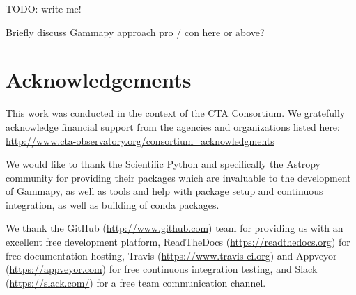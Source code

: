 \documentclass{PoS}
\newcommand{\url}[1]{\href{#1}{#1}}
\begin{document}
TODO: write me!

Briefly discuss Gammapy approach pro / con here or above?

\section{Acknowledgements}
\label{sed:acknowledgements}

This work was conducted in the context of the CTA Consortium. We gratefully
acknowledge financial support from the agencies and organizations listed here:
\url{http://www.cta-observatory.org/consortium\_acknowledgments}

We would like to thank the Scientific Python and specifically the Astropy
community for providing their packages which are invaluable to the development
of Gammapy, as well as tools and help with package setup and continuous
integration, as well as building of conda packages.

We thank the GitHub (\url{http://www.github.com}) team for providing us with an
excellent free development platform, ReadTheDocs (\url{https://readthedocs.org})
for free documentation hosting, Travis (\url{https://www.travis-ci.org}) and
Appveyor (\url{https://appveyor.com}) for free continuous integration testing,
and Slack (\url{https://slack.com/}) for a free team communication channel.




\end{document}
